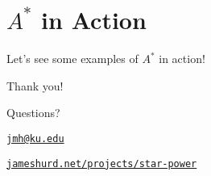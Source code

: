\documentclass{beamer}
\begin{document}
\section{$A^*$ in Action }
\begin{frame} 
  
  \begin{center}
    \LARGE
    Let's see some examples of $A^*$ in action! 
  \end{center}

\end{frame}

\begin{frame} 
 
  \begin{center}
    \Large{
      Thank you! 

    Questions?
    
    \vspace{0.5em}


    \vspace{0.5em}

    \href{mailto:jmh@ku.edu}{\texttt{jmh@ku.edu}}

    \href{https://jameshurd.net/projects/star-power}{\texttt{jameshurd.net/projects/star-power}}

    \hfill{}
  }
  \end{center}

\end{frame}
\end{document}
